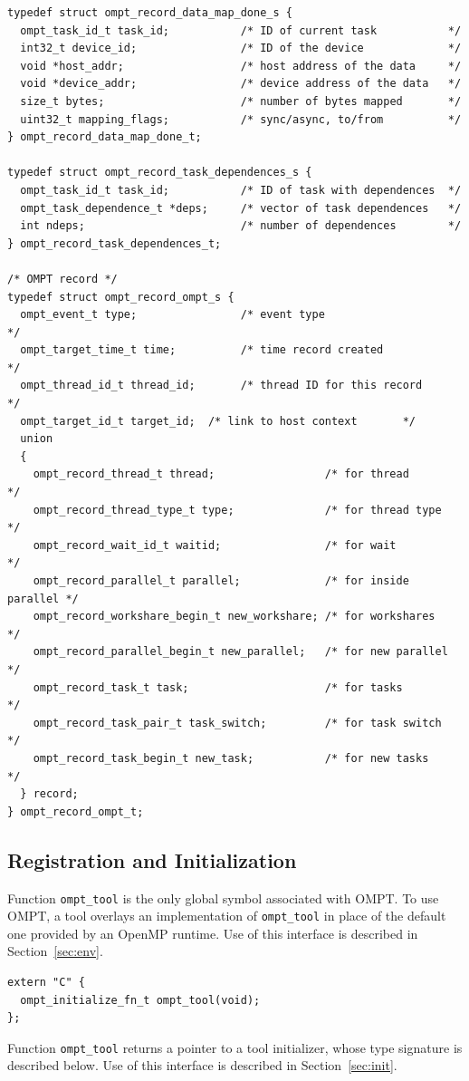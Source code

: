 \documentclass{article}
\begin{document}
{\begin{verbatim}
typedef struct ompt_record_data_map_done_s {
  ompt_task_id_t task_id;           /* ID of current task           */
  int32_t device_id;                /* ID of the device             */
  void *host_addr;                  /* host address of the data     */
  void *device_addr;                /* device address of the data   */ 
  size_t bytes;                     /* number of bytes mapped       */
  uint32_t mapping_flags;           /* sync/async, to/from          */
} ompt_record_data_map_done_t;

typedef struct ompt_record_task_dependences_s {
  ompt_task_id_t task_id;           /* ID of task with dependences  */
  ompt_task_dependence_t *deps;     /* vector of task dependences   */
  int ndeps;                        /* number of dependences        */
} ompt_record_task_dependences_t;

/* OMPT record */
typedef struct ompt_record_ompt_s {
  ompt_event_t type;                /* event type                       */
  ompt_target_time_t time;          /* time record created              */
  ompt_thread_id_t thread_id;       /* thread ID for this record        */
  ompt_target_id_t target_id;  /* link to host context       */
  union
  {
    ompt_record_thread_t thread;                 /* for thread          */
    ompt_record_thread_type_t type;              /* for thread type     */
    ompt_record_wait_id_t waitid;                /* for wait            */
    ompt_record_parallel_t parallel;             /* for inside parallel */
    ompt_record_workshare_begin_t new_workshare; /* for workshares      */
    ompt_record_parallel_begin_t new_parallel;   /* for new parallel    */
    ompt_record_task_t task;                     /* for tasks           */
    ompt_record_task_pair_t task_switch;         /* for task switch     */
    ompt_record_task_begin_t new_task;           /* for new tasks       */
  } record;
} ompt_record_ompt_t;
\end{verbatim}

\clearpage
\subsection{Registration and Initialization} 
\label{sec:app:init}

\noindent
Function \verb|ompt_tool| is the only global symbol associated with OMPT. To use OMPT, a tool overlays an implementation of \verb|ompt_tool| in place of the default one provided by an OpenMP runtime. Use of this interface is described in Section~\ref{sec:env}.
\begin{verbatim}
extern "C" {
  ompt_initialize_fn_t ompt_tool(void);
};
\end{verbatim}
Function \verb|ompt_tool| returns a pointer to a tool initializer, whose type signature is described below. Use of this interface is described in Section~\ref{sec:init}.

}
\end{document}
